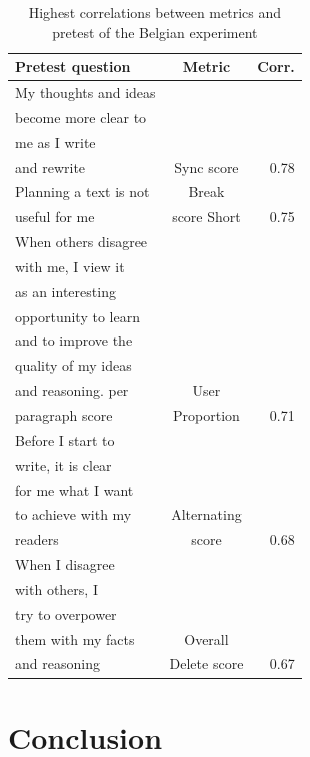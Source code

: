 \documentclass[a4, twocolumn, 12pt]{article}
\begin{document}
\begin{table}[h]
\begin{tabular}{|l|c|r|}
  \hline
  Pretest question & Metric & Corr. \\
  \hline
  My thoughts and ideas && \\
  become more clear to &&\\
  me as I write &&\\
  and rewrite & Sync score & 0.78 \\
  \hline
  Planning a text is not &Break&\\
  useful for me & score Short & 0.75 \\
  \hline
  When others disagree&&\\
  with me, I view it &&\\
  as an interesting&&\\
  opportunity to learn &&\\
  and to improve the &&\\
  quality of my ideas &&\\
  and reasoning. per &User& \\
  paragraph score& Proportion & 0.71 \\
  \hline
  Before I start to &&\\
  write, it is clear &&\\
  for me what I want &&\\
  to achieve with my &Alternating&\\
  readers & score & 0.68\\
  \hline
  When I disagree&& \\
  with others, I &&\\
  try to overpower &&\\
  them with my facts &Overall&\\
  and reasoning &Delete score & 0.67\\
  \hline
\end{tabular}
\caption{Highest correlations between metrics and pretest of the Belgian experiment}
\label{table:corr}
\end{table}


\section{Conclusion}
\end{document}
